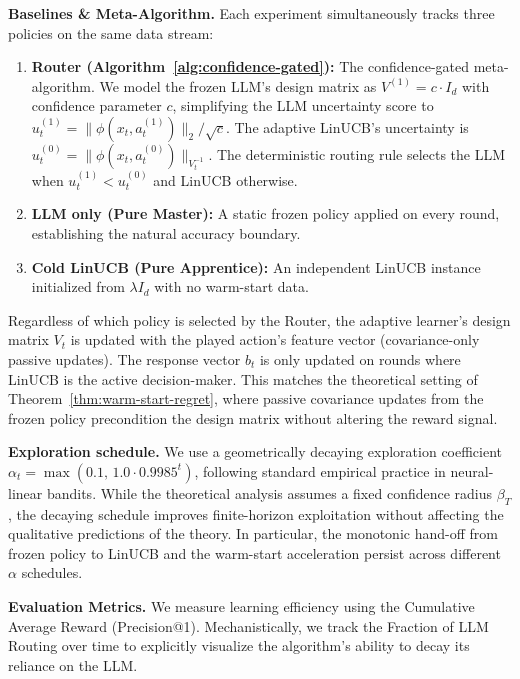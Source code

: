 \textbf{Baselines \& Meta-Algorithm.} Each experiment simultaneously tracks three policies on the same data stream:
\begin{enumerate}[nosep]
    \item \textbf{Router (Algorithm~\ref{alg:confidence-gated}):} The confidence-gated meta-algorithm. We model the frozen LLM's design matrix as $V^{(1)} = c \cdot I_d$ with confidence parameter $c$, simplifying the LLM uncertainty score to $u_t^{(1)} = \|\phi(x_t, a_t^{(1)})\|_2 / \sqrt{c}$. The adaptive LinUCB's uncertainty is $u_t^{(0)} = \|\phi(x_t, a_t^{(0)})\|_{V_t^{-1}}$. The deterministic routing rule selects the LLM when $u_t^{(1)} < u_t^{(0)}$ and LinUCB otherwise.
    \item \textbf{LLM only (Pure Master):} A static frozen policy applied on every round, establishing the natural accuracy boundary.
    \item \textbf{Cold LinUCB (Pure Apprentice):} An independent LinUCB instance initialized from $\lambda I_d$ with no warm-start data.
\end{enumerate}

Regardless of which policy is selected by the Router, the adaptive learner's design matrix $V_t$ is updated with the played action's feature vector (covariance-only passive updates). The response vector $b_t$ is only updated on rounds where LinUCB is the active decision-maker. This matches the theoretical setting of Theorem~\ref{thm:warm-start-regret}, where passive covariance updates from the frozen policy precondition the design matrix without altering the reward signal.

\textbf{Exploration schedule.} We use a geometrically decaying exploration coefficient $\alpha_t = \max(0.1,\, 1.0 \cdot 0.9985^t)$, following standard empirical practice in neural-linear bandits. While the theoretical analysis assumes a fixed confidence radius $\beta_T$, the decaying schedule improves finite-horizon exploitation without affecting the qualitative predictions of the theory. In particular, the monotonic hand-off from frozen policy to LinUCB and the warm-start acceleration persist across different $\alpha$ schedules.

\textbf{Evaluation Metrics.} We measure learning efficiency using the Cumulative Average Reward (Precision@1). Mechanistically, we track the Fraction of LLM Routing over time to explicitly visualize the algorithm's ability to decay its reliance on the LLM.

